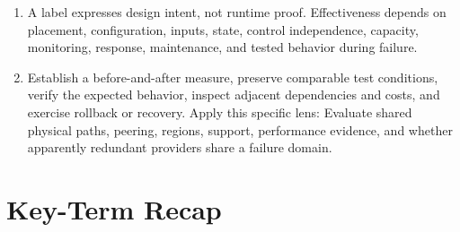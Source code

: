 \documentclass[11pt]{article}
\begin{document}
\begin{enumerate}
\item A label expresses design intent, not runtime proof. Effectiveness depends on placement, configuration, inputs, state, control independence, capacity, monitoring, response, maintenance, and tested behavior during failure.
\item Establish a before-and-after measure, preserve comparable test conditions, verify the expected behavior, inspect adjacent dependencies and costs, and exercise rollback or recovery. Apply this specific lens: Evaluate shared physical paths, peering, regions, support, performance evidence, and whether apparently redundant providers share a failure domain.
\end{enumerate}
\section{Key-Term Recap}
\end{document}

